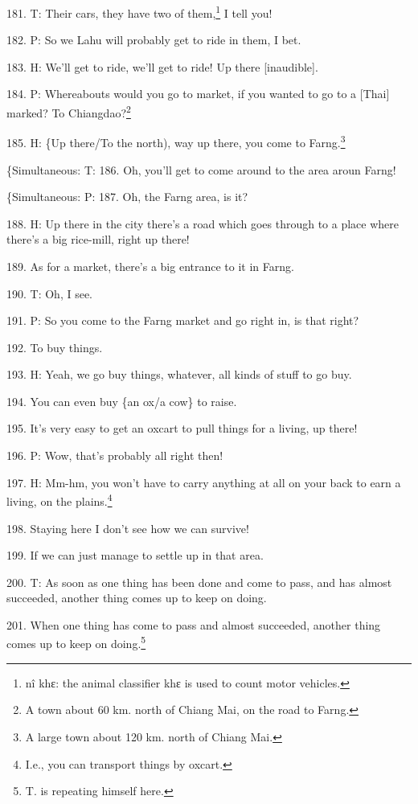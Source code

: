 181. T: Their cars, they have two of them,\footnote{nî khɛ: the animal classifier khɛ is used to count motor vehicles.} I tell you!

182. P: So we Lahu will probably get to ride in them, I bet.

183. H: We'll get to ride, we'll get to ride! Up there [inaudible].

184. P: Whereabouts would you go to market, if you wanted to go to a [Thai] marked?
To Chiangdao?\footnote{A town about 60 km. north of Chiang Mai, on the road to Farng.}

185. H: \{Up there/To the north), way up there, you come to Farng.\footnote{A large town about 120 km. north of Chiang Mai.}

\{Simultaneous: T: 186. Oh, you'll get to come around to the area aroun Farng!

\{Simultaneous: P: 187. Oh, the Farng area, is it?

188. H: Up there in the city there's a road which goes through to a place where
there's a big rice-mill, right up there!

189. As for a market, there's a big entrance to it in Farng.

190. T: Oh, I see.

191. P: So you come to the Farng market and go right in, is that right?

192. To buy things.

193. H: Yeah, we go buy things, whatever, all kinds of stuff to go buy.

194. You can even buy \{an ox/a cow\} to raise.

195. It's very easy to get an oxcart to pull things for a living, up there!

196. P: Wow, that's probably all right then!

197. H: Mm-hm, you won't have to carry anything at all on your back to earn a living,
on the plains.\footnote{I.e., you can transport things by oxcart.}

198. Staying here I don't see how we can survive!

199. If we can just manage to settle up in that area.

200. T: As soon as one thing has been done and come to pass, and has almost succeeded,
another thing comes up to keep on doing.

201. When one thing has come to pass and almost succeeded, another thing comes
up to keep on doing.\footnote{T. is repeating himself here.}

